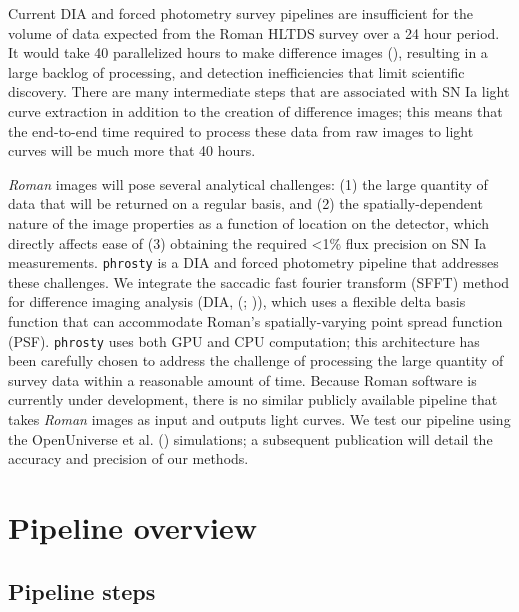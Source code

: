 \documentclass[10pt,a4paper,onecolumn]{article}
\begin{document}
Current DIA and forced photometry survey pipelines are insufficient for
the volume of data expected from the Roman HLTDS survey over a 24 hour
period. It would take 40 parallelized hours to make difference images
(), resulting in a large
backlog of processing, and detection inefficiencies that limit
scientific discovery. There are many intermediate steps that are
associated with SN Ia light curve extraction in addition to the creation
of difference images; this means that the end-to-end time required to
process these data from raw images to light curves will be much more
that 40 hours.

\emph{Roman} images will pose several analytical challenges: (1) the
large quantity of data that will be returned on a regular basis, and (2)
the spatially-dependent nature of the image properties as a function of
location on the detector, which directly affects ease of (3) obtaining
the required \textless1\% flux precision on SN Ia measurements.
\texttt{phrosty} is a DIA and forced photometry pipeline that addresses
these challenges. We integrate the saccadic fast fourier transform
(SFFT) method for difference imaging analysis (DIA,
(; )), which uses a flexible delta basis function that can
accommodate Roman's spatially-varying point spread function (PSF).
\texttt{phrosty} uses both GPU and CPU computation; this architecture
has been carefully chosen to address the challenge of processing the
large quantity of survey data within a reasonable amount of time.
Because Roman software is currently under development, there is no
similar publicly available pipeline that takes \emph{Roman} images as
input and outputs light curves. We test our pipeline using the
OpenUniverse et al. () simulations; a
subsequent publication will detail the accuracy and precision of our
methods.

\section{Pipeline overview}\label{pipeline-overview}

\subsection{Pipeline steps}\label{pipeline-steps}
\end{document}
